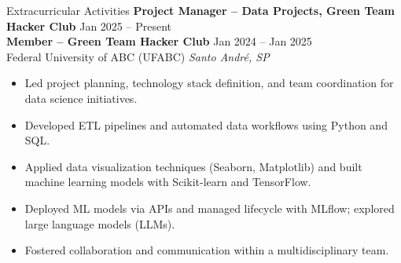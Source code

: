 \documentclass{article}
\begin{document}
\begin{rSection}{Extracurricular Activities}
\textbf{Project Manager – Data Projects, Green Team Hacker Club} \hfill Jan 2025 -- Present \\
\textbf{Member – Green Team Hacker Club} \hfill Jan 2024 -- Jan 2025 \\
Federal University of ABC (UFABC) \hfill \textit{Santo André, SP}
 \begin{itemize}
    \item Led project planning, technology stack definition, and team coordination for data science initiatives.
    \item Developed ETL pipelines and automated data workflows using Python and SQL.
    \item Applied data visualization techniques (Seaborn, Matplotlib) and built machine learning models with Scikit-learn and TensorFlow.
    \item Deployed ML models via APIs and managed lifecycle with MLflow; explored large language models (LLMs).
    \item Fostered collaboration and communication within a multidisciplinary team.
 \end{itemize}
\end{rSection} 
\end{document}
